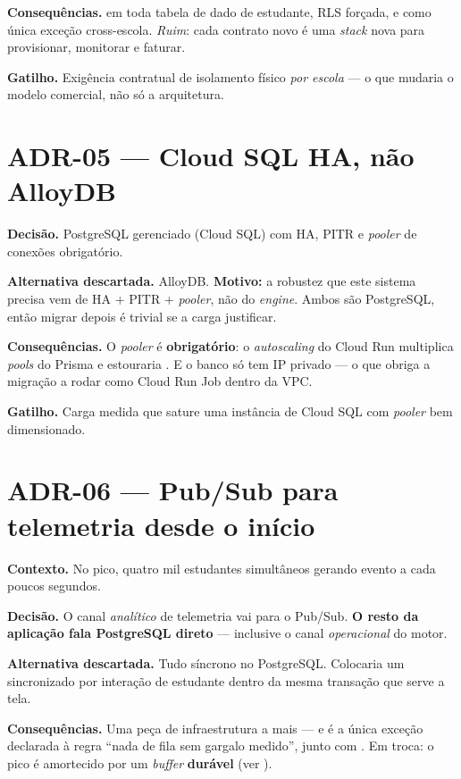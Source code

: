 \textbf{Consequências.}  em toda tabela de dado de estudante, RLS
forçada, e  como única exceção cross-escola. \emph{Ruim}: cada
contrato novo é uma \emph{stack} nova para provisionar, monitorar e faturar.

\textbf{Gatilho.} Exigência contratual de isolamento físico \emph{por escola} ---
o que mudaria o modelo comercial, não só a arquitetura.

\section{ADR-05 --- Cloud SQL HA, não AlloyDB}

\textbf{Decisão.} PostgreSQL gerenciado (Cloud SQL) com HA, PITR e \emph{pooler}
de conexões obrigatório.

\textbf{Alternativa descartada.} AlloyDB. \textbf{Motivo:} a robustez que este
sistema precisa vem de HA + PITR + \emph{pooler}, não do \emph{engine}. Ambos são
PostgreSQL, então migrar depois é trivial se a carga justificar.

\textbf{Consequências.} O \emph{pooler} é \textbf{obrigatório}: o
\emph{autoscaling} do Cloud Run multiplica \emph{pools} do Prisma e estouraria
. E o banco só tem IP privado --- o que obriga a migração a
rodar como Cloud Run Job dentro da VPC.

\textbf{Gatilho.} Carga medida que sature uma instância de Cloud SQL com
\emph{pooler} bem dimensionado.

\section{ADR-06 --- Pub/Sub para telemetria desde o início}

\textbf{Contexto.} No pico, quatro mil estudantes simultâneos gerando evento a cada
poucos segundos.

\textbf{Decisão.} O canal \emph{analítico} de telemetria vai para o Pub/Sub.
\textbf{O resto da aplicação fala PostgreSQL direto} --- inclusive o canal
\emph{operacional} do motor.

\textbf{Alternativa descartada.} Tudo síncrono no PostgreSQL. Colocaria um
 sincronizado por interação de estudante dentro da mesma transação que
serve a tela.

\textbf{Consequências.} Uma peça de infraestrutura a mais --- e é a única exceção
declarada à regra \enquote{nada de fila sem gargalo medido}, junto com
. Em troca: o pico é amortecido por um \emph{buffer} \textbf{durável}
(ver ).

